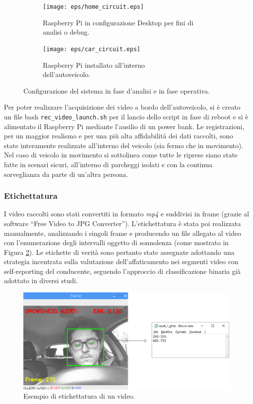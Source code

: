 \documentclass[12pt]{article}
\newcommand{\quotes}[1]{``#1''}
\begin{document}
\begin{figure}[!htb]
	\begin{subfigure}{.45\textwidth}
		\centering
		\texttt{[image: eps/home\_circuit.eps]}
		\caption{Raspberry Pi in configurazione Desktop per fini di analisi o debug.}
	\end{subfigure}
	\hspace{5mm}
	\begin{subfigure}{.55\textwidth}
		\centering
		\texttt{[image: eps/car\_circuit.eps]}
		\caption{Raspberry Pi installato all'interno\\dell'autoveicolo.}
	\end{subfigure}
	\caption{Configurazione del sistema in fase d'analisi e in fase operativa.}
	\label{fig:system_uses}
\end{figure}

Per poter realizzare l'acquisizione dei video a bordo dell'autoveicolo, si è creato un file bash \texttt{rec\_video\_launch.sh} per il lancio dello script in fase di reboot e si è alimentato il Raspberry Pi mediante l'ausilio di un power bank. Le registrazioni, per un maggior realismo e per una più alta affidabilità dei dati raccolti, sono state interamente realizzate all'interno del veicolo (sia fermo che in movimento). Nel caso di veicolo in movimento si sottolinea come tutte le riprese siano state fatte in scenari sicuri, all'interno di parcheggi isolati e con la continua sorveglianza da parte di un'altra persona. 

\subsubsection{Etichettatura}
I video raccolti sono stati convertiti in formato \textit{mp4} e suddivisi in frame (grazie al software \quotes{Free Video to JPG Converter}\cite{FrameExtraction}). L'etichettatura è stata poi realizzata manualmente, analizzando i singoli frame e producendo un file allegato al video con l'enumerazione degli intervalli oggetto di sonnolenza (come mostrato in Figura \ref{fig:video_label}). Le etichette di verità sono pertanto state assegnate adottando una strategia incentrata sulla valutazione dell'affaticamento nei segmenti video con self-reporting del conducente, seguendo l'approccio di classificazione binaria già adottato in diversi studi\cite{SelfReportedAnalysis}\cite{ExpertsAnalysis}. 

\begin{figure}[!htb]
	\centering
	\includegraphics[scale=0.45]{eps/result_1_gf.eps}
	\caption{Esempio di etichettatura di un video.}
	\label{fig:video_label}
\end{figure}
\end{document}
